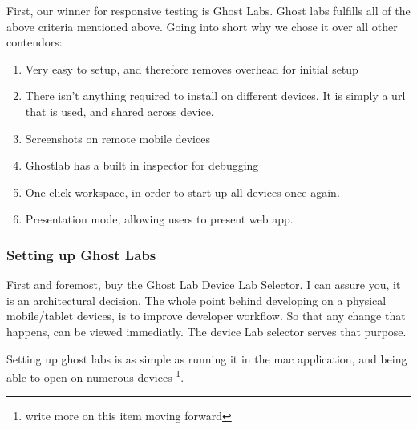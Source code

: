 First, our winner for responsive testing is Ghost Labs. Ghost labs fulfills all
of the above criteria mentioned above. Going into short why we chose it over
all other contendors:
\begin{enumerate}
  \item Very easy to setup, and therefore removes overhead for initial setup
  \item There isn't anything required to install on different devices. It is
  simply a url that is used, and shared across device.
  \item Screenshots on remote mobile devices
  \item Ghostlab has a built in inspector for debugging
  \item One click workspace, in order to start up all devices once again.
  \item Presentation mode, allowing users to present web app.
\end{enumerate}

\subsubsection{ Setting up Ghost Labs }
First and foremost, buy the Ghost Lab Device Lab Selector. I can assure you, it
is an architectural decision. The whole point behind developing on a physical
mobile/tablet devices, is to improve developer workflow. So that any change that
happens, can be viewed immediatly. The device Lab selector serves that purpose.

Setting up ghost labs is as simple as running it in the mac application, and
being able to open on numerous devices \footnote{write more on this item moving
forward}.
